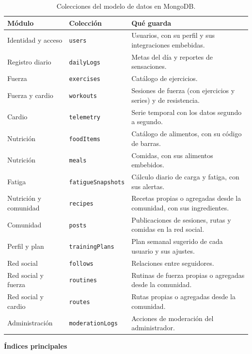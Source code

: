 \begin{table}[h!]
    \centering
    \renewcommand{\arraystretch}{1.3}
    \begin{tabular}{|p{3.0cm}|p{3.9cm}|p{7.5cm}|}
        \hline
        \rowcolor[HTML]{EFEFEF}
        \textbf{Módulo} & \textbf{Colección} & \textbf{Qué guarda} \\ \hline
        Identidad y acceso & \texttt{users} & Usuarios, con su perfil y sus integraciones embebidas. \\ \hline
        Registro diario & \texttt{dailyLogs} & Metas del día y reportes de sensaciones. \\ \hline
        Fuerza & \texttt{exercises} & Catálogo de ejercicios. \\ \hline
        Fuerza y cardio & \texttt{workouts} & Sesiones de fuerza (con ejercicios y series) y de resistencia. \\ \hline
        Cardio & \texttt{telemetry} & Serie temporal con los datos segundo a segundo. \\ \hline
        Nutrición & \texttt{foodItems} & Catálogo de alimentos, con su código de barras. \\ \hline
        Nutrición & \texttt{meals} & Comidas, con sus alimentos embebidos. \\ \hline
        Fatiga & \texttt{fatigueSnapshots} & Cálculo diario de carga y fatiga, con sus alertas. \\ \hline
        Nutrición y comunidad & \texttt{recipes} & Recetas propias o agregadas desde la comunidad, con sus ingredientes. \\ \hline
        Comunidad & \texttt{posts} & Publicaciones de sesiones, rutas y comidas en la red social. \\ \hline
        Perfil y plan & \texttt{trainingPlans} & Plan semanal sugerido de cada usuario y sus ajustes. \\ \hline
        Red social & \texttt{follows} & Relaciones entre seguidores. \\ \hline
        Red social y fuerza & \texttt{routines} & Rutinas de fuerza propias o agregadas desde la comunidad. \\ \hline
        Red social y cardio & \texttt{routes} & Rutas propias o agregadas desde la comunidad. \\ \hline
        Administración & \texttt{moderationLogs} & Acciones de moderación del administrador. \\ \hline
    \end{tabular}
    \caption{Colecciones del modelo de datos en MongoDB.}
    \label{tab:colecciones}
\end{table}
\newpage
\textbf{Índices principales}

